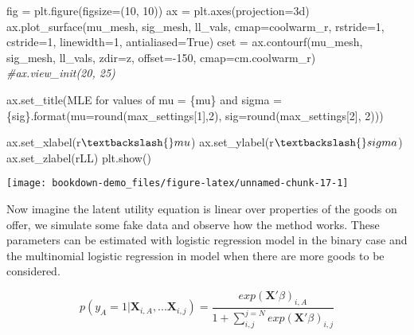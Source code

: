 \documentclass[]{tufte-book}
\newenvironment{Shaded}{}{}
\newcommand{\BuiltInTok}[1]{#1}
\newcommand{\CommentTok}[1]{\textcolor[rgb]{0.38,0.63,0.69}{\textit{#1}}}
\newcommand{\DecValTok}[1]{\textcolor[rgb]{0.25,0.63,0.44}{#1}}
\newcommand{\NormalTok}[1]{#1}
\newcommand{\OperatorTok}[1]{\textcolor[rgb]{0.40,0.40,0.40}{#1}}
\newcommand{\SpecialCharTok}[1]{\textcolor[rgb]{0.25,0.44,0.63}{#1}}
\newcommand{\StringTok}[1]{\textcolor[rgb]{0.25,0.44,0.63}{#1}}
\newcommand{\VariableTok}[1]{\textcolor[rgb]{0.10,0.09,0.49}{#1}}
\newcommand{\VerbatimStringTok}[1]{\textcolor[rgb]{0.25,0.44,0.63}{#1}}
\theoremstyle{definition}
\theoremstyle{definition}
\theoremstyle{definition}
\theoremstyle{remark}
\begin{document}
\begin{Shaded}
\begin{Highlighting}[]
\NormalTok{fig }\OperatorTok{=}\NormalTok{ plt.figure(figsize}\OperatorTok{=}\NormalTok{(}\DecValTok{10}\NormalTok{, }\DecValTok{10}\NormalTok{))}
\NormalTok{ax }\OperatorTok{=}\NormalTok{ plt.axes(projection}\OperatorTok{=}\StringTok{\textquotesingle{}3d\textquotesingle{}}\NormalTok{)}
\NormalTok{ax.plot\_surface(mu\_mesh, sig\_mesh, ll\_vals, }
\NormalTok{cmap}\OperatorTok{=}\StringTok{\textquotesingle{}coolwarm\_r\textquotesingle{}}\NormalTok{, rstride}\OperatorTok{=}\DecValTok{1}\NormalTok{, cstride}\OperatorTok{=}\DecValTok{1}\NormalTok{, linewidth}\OperatorTok{=}\DecValTok{1}\NormalTok{, antialiased}\OperatorTok{=}\VariableTok{True}\NormalTok{)}
\NormalTok{cset }\OperatorTok{=}\NormalTok{ ax.contourf(mu\_mesh, sig\_mesh, ll\_vals, zdir}\OperatorTok{=}\StringTok{\textquotesingle{}z\textquotesingle{}}\NormalTok{, offset}\OperatorTok{={-}}\DecValTok{150}\NormalTok{, cmap}\OperatorTok{=}\NormalTok{cm.coolwarm\_r)}
\CommentTok{\#ax.view\_init(20, 25)}

\NormalTok{ax.set\_title(}\StringTok{\textquotesingle{}MLE for values of mu = }\SpecialCharTok{\{mu\}}\StringTok{ and sigma = }\SpecialCharTok{\{sig\}}\StringTok{\textquotesingle{}}\NormalTok{.}\BuiltInTok{format}\NormalTok{(mu}\OperatorTok{=}\BuiltInTok{round}\NormalTok{(max\_settings[}\DecValTok{1}\NormalTok{],}\DecValTok{2}\NormalTok{),}
\NormalTok{sig}\OperatorTok{=}\BuiltInTok{round}\NormalTok{(max\_settings[}\DecValTok{2}\NormalTok{], }\DecValTok{2}\NormalTok{)))}

\NormalTok{ax.set\_xlabel(}\VerbatimStringTok{r\textquotesingle{}$\textbackslash{}mu$\textquotesingle{}}\NormalTok{)}
\NormalTok{ax.set\_ylabel(}\VerbatimStringTok{r\textquotesingle{}$\textbackslash{}sigma$\textquotesingle{}}\NormalTok{)}
\NormalTok{ax.set\_zlabel(}\VerbatimStringTok{r\textquotesingle{}LL\textquotesingle{}}\NormalTok{)}
\NormalTok{plt.show()}
\end{Highlighting}
\end{Shaded}

\texttt{[image: bookdown-demo\_files/figure-latex/unnamed-chunk-17-1]}

Now imagine the latent utility equation is linear over properties of the goods on offer, we simulate some fake data and observe how the method works.
These parameters can be estimated with logistic regression model in the binary case and the multinomial logistic regression in model when there are more goods to be considered.

\[ p(y_A = 1 | \mathbf{X}_{i, A}, ...  \mathbf{X}_{i, j}) = \frac{ exp(\mathbf{X'}\beta)_{i, A}}{1 + \sum_{i, j}^{j=N} exp(\mathbf{X'}\beta)_{i, j} }  \]
\end{document}

